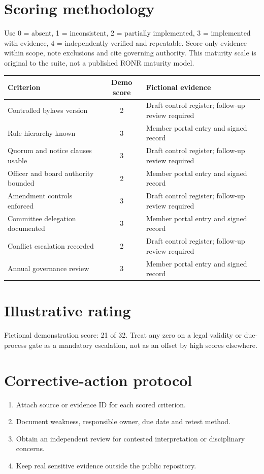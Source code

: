 \documentclass[11pt]{article}
\begin{document}
\SuiteOpen
\section{Scoring methodology}
Use 0 = absent, 1 = inconsistent, 2 = partially implemented, 3 = implemented with evidence, 4 = independently verified and repeatable. Score only evidence within scope, note exclusions and cite governing authority. This maturity scale is original to the suite, not a published RONR maturity model.

\small\begin{longtable}{@{}p{.44\linewidth}cp{.39\linewidth}@{}}\toprule Criterion & Demo score & Fictional evidence\\\midrule\endhead

Controlled bylaws version & 2 & Draft control register; follow-up review required\\
Rule hierarchy known & 3 & Member portal entry and signed record\\
Quorum and notice clauses usable & 3 & Draft control register; follow-up review required\\
Officer and board authority bounded & 2 & Member portal entry and signed record\\
Amendment controls enforced & 3 & Draft control register; follow-up review required\\
Committee delegation documented & 3 & Member portal entry and signed record\\
Conflict escalation recorded & 2 & Draft control register; follow-up review required\\
Annual governance review & 3 & Member portal entry and signed record\\
\bottomrule\end{longtable}\normalsize
\section{Illustrative rating}
Fictional demonstration score: 21 of 32. Treat any zero on a legal validity or due-process gate as a mandatory escalation, not as an offset by high scores elsewhere.

\section{Corrective-action protocol}
\begin{enumerate}[leftmargin=*,itemsep=4pt]
\item Attach source or evidence ID for each scored criterion.
\item Document weakness, responsible owner, due date and retest method.
\item Obtain an independent review for contested interpretation or disciplinary concerns.
\item Keep real sensitive evidence outside the public repository.
\end{enumerate}
\end{document}
